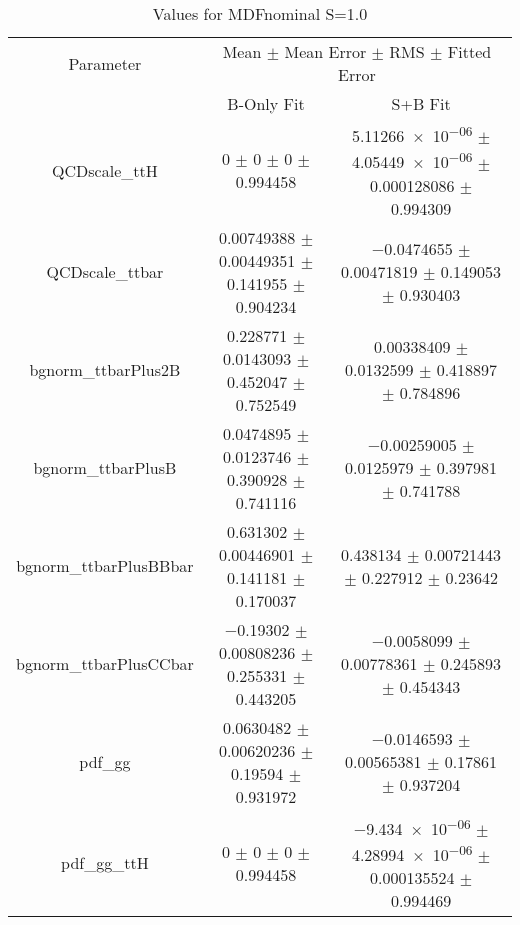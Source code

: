\begin{table}
\centering
\caption{Values for MDFnominal S=1.0}
\begin{tabular}{ccc}
\toprule
Parameter & \multicolumn{2}{c}{Mean $\pm$ Mean Error $\pm$ RMS $\pm$ Fitted Error}\\
 & B-Only Fit & S+B Fit\\
\midrule
QCDscale\_ttH & \num{0} $\pm$ \num{0} $\pm$ \num{0} $\pm$ \num{0.994458} & \num{5.11266e-06} $\pm$ \num{4.05449e-06} $\pm$ \num{0.000128086} $\pm$ \num{0.994309}\\
QCDscale\_ttbar & \num{0.00749388} $\pm$ \num{0.00449351} $\pm$ \num{0.141955} $\pm$ \num{0.904234} & \num{-0.0474655} $\pm$ \num{0.00471819} $\pm$ \num{0.149053} $\pm$ \num{0.930403}\\
bgnorm\_ttbarPlus2B & \num{0.228771} $\pm$ \num{0.0143093} $\pm$ \num{0.452047} $\pm$ \num{0.752549} & \num{0.00338409} $\pm$ \num{0.0132599} $\pm$ \num{0.418897} $\pm$ \num{0.784896}\\
bgnorm\_ttbarPlusB & \num{0.0474895} $\pm$ \num{0.0123746} $\pm$ \num{0.390928} $\pm$ \num{0.741116} & \num{-0.00259005} $\pm$ \num{0.0125979} $\pm$ \num{0.397981} $\pm$ \num{0.741788}\\
bgnorm\_ttbarPlusBBbar & \num{0.631302} $\pm$ \num{0.00446901} $\pm$ \num{0.141181} $\pm$ \num{0.170037} & \num{0.438134} $\pm$ \num{0.00721443} $\pm$ \num{0.227912} $\pm$ \num{0.23642}\\
bgnorm\_ttbarPlusCCbar & \num{-0.19302} $\pm$ \num{0.00808236} $\pm$ \num{0.255331} $\pm$ \num{0.443205} & \num{-0.0058099} $\pm$ \num{0.00778361} $\pm$ \num{0.245893} $\pm$ \num{0.454343}\\
pdf\_gg & \num{0.0630482} $\pm$ \num{0.00620236} $\pm$ \num{0.19594} $\pm$ \num{0.931972} & \num{-0.0146593} $\pm$ \num{0.00565381} $\pm$ \num{0.17861} $\pm$ \num{0.937204}\\
pdf\_gg\_ttH & \num{0} $\pm$ \num{0} $\pm$ \num{0} $\pm$ \num{0.994458} & \num{-9.434e-06} $\pm$ \num{4.28994e-06} $\pm$ \num{0.000135524} $\pm$ \num{0.994469}\\
\bottomrule
\end{tabular}
\end{table}